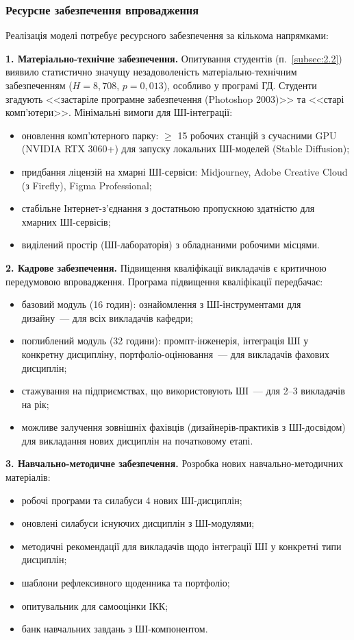 \subsubsection{Ресурсне забезпечення впровадження}\label{sssec:3.3.5}

Реалізація моделі потребує ресурсного забезпечення за кількома напрямками:

\textbf{1. Матеріально-технічне забезпечення.} Опитування студентів (п.~\ref{subsec:2.2}) виявило статистично значущу незадоволеність матеріально-технічним забезпеченням ($H = 8{,}708$, $p = 0{,}013$), особливо у програмі ГД. Студенти згадують <<застаріле програмне забезпечення (Photoshop 2003)>> та <<старі комп'ютери>>. Мінімальні вимоги для ШІ-інтеграції:
\begin{itemize}
    \item оновлення комп'ютерного парку: $\geq$ 15 робочих станцій з сучасними GPU (NVIDIA RTX 3060+) для запуску локальних ШІ-моделей (Stable Diffusion);
    \item придбання ліцензій на хмарні ШІ-сервіси: Midjourney, Adobe Creative Cloud (з Firefly), Figma Professional;
    \item стабільне Інтернет-з'єднання з достатньою пропускною здатністю для хмарних ШІ-сервісів;
    \item виділений простір (ШІ-лабораторія) з обладнаними робочими місцями.
\end{itemize}

\textbf{2. Кадрове забезпечення.} Підвищення кваліфікації викладачів є критичною передумовою впровадження. Програма підвищення кваліфікації передбачає:
\begin{itemize}
    \item базовий модуль (16 годин): ознайомлення з ШІ-інструментами для дизайну~--- для всіх викладачів кафедри;
    \item поглиблений модуль (32 години): промпт-інженерія, інтеграція ШІ у конкретну дисципліну, портфоліо-оцінювання~--- для викладачів фахових дисциплін;
    \item стажування на підприємствах, що використовують ШІ~--- для 2--3 викладачів на рік;
    \item можливе залучення зовнішніх фахівців (дизайнерів-практиків з ШІ-досвідом) для викладання нових дисциплін на початковому етапі.
\end{itemize}

\textbf{3. Навчально-методичне забезпечення.} Розробка нових навчально-методичних матеріалів:
\begin{itemize}
    \item робочі програми та силабуси 4 нових ШІ-дисциплін;
    \item оновлені силабуси існуючих дисциплін з ШІ-модулями;
    \item методичні рекомендації для викладачів щодо інтеграції ШІ у конкретні типи дисциплін;
    \item шаблони рефлексивного щоденника та портфоліо;
    \item опитувальник для самооцінки ІКК;
    \item банк навчальних завдань з ШІ-компонентом.
\end{itemize}

